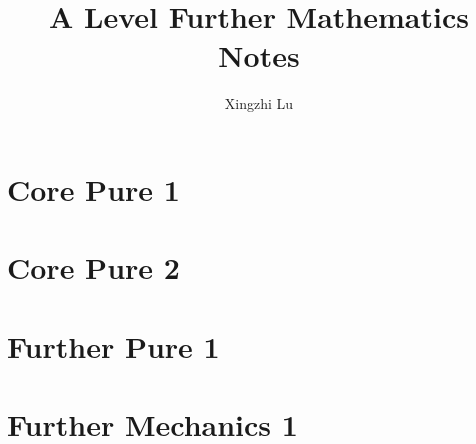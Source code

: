 \documentclass[oneside,fleqn,11pt]{book}
\title{A Level Further Mathematics Notes}
\author{Xingzhi Lu}
\date{}
\begin{document}
\everymath{\displaystyle}
\maketitle
\tableofcontents
\pagebreak
\part{Core Pure 1}


\setcounter{chapter}{0}

\part{Core Pure 2}



\setcounter{chapter}{0}
\part{Further Pure 1}



\setcounter{chapter}{0}
\part{Further Mechanics 1}

\end{document}
